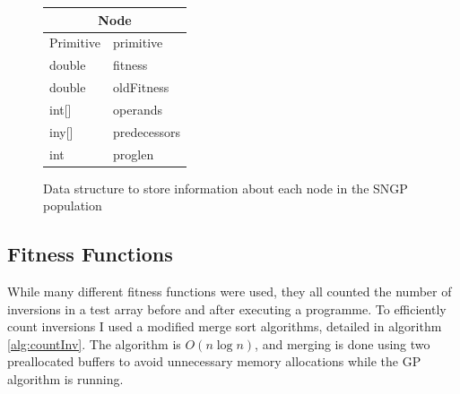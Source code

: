 \documentclass{article}
\begin{document}
			\begin{figure}[h]
				\centering
				\begin{tabular}{|l l|}
					\hline
					\multicolumn{2}{|c|}{Node}\\
					\hline
					Primitive & primitive \\
					double & fitness\\
					double & oldFitness\\
					int[] & operands\\
					iny[] & predecessors\\
					int & proglen\\
					\hline
				\end{tabular}
				\caption{Data structure to store information about each node in the SNGP population}
				
				\label{struct:sngp_node}
			\end{figure}
		
		\subsection{Fitness Functions}
		
			While many different fitness functions were used, they all counted the number of inversions in a test array before and after executing a programme. To efficiently count inversions I used a modified merge sort algorithms, detailed in algorithm \ref{alg:countInv}. The algorithm is $O(n\log{}n)$, and merging is done using two preallocated buffers to avoid unnecessary memory allocations while the GP algorithm is running.
			
\end{document}
